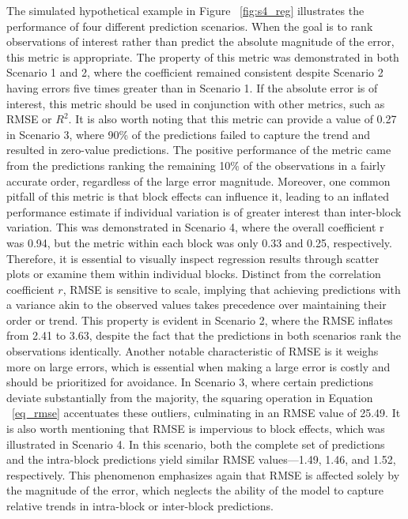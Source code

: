 The simulated hypothetical example in Figure ~\ref{fig:s4_reg} illustrates the performance of four different prediction scenarios. When the goal is to rank observations of interest rather than predict the absolute magnitude of the error, this metric is appropriate. The property of this metric was demonstrated in both Scenario 1 and 2, where the coefficient remained consistent despite Scenario 2 having errors five times greater than in Scenario 1. If the absolute error is of interest, this metric should be used in conjunction with other metrics, such as RMSE or $R^2$. It is also worth noting that this metric can provide a value of 0.27 in Scenario 3, where 90\% of the predictions failed to capture the trend and resulted in zero-value predictions. The positive performance of the metric came from the predictions ranking the remaining 10\% of the observations in a fairly accurate order, regardless of the large error magnitude. Moreover, one common pitfall of this metric is that block effects can influence it, leading to an inflated performance estimate if individual variation is of greater interest than inter-block variation. This was demonstrated in Scenario 4, where the overall coefficient r was 0.94, but the metric within each block was only 0.33 and 0.25, respectively. Therefore, it is essential to visually inspect regression results through scatter plots or examine them within individual blocks.
Distinct from the correlation coefficient $r$, RMSE is sensitive to scale, implying that achieving predictions with a variance akin to the observed values takes precedence over maintaining their order or trend. This property is evident in Scenario 2, where the RMSE inflates from 2.41 to 3.63, despite the fact that the predictions in both scenarios rank the observations identically. Another notable characteristic of RMSE is it weighs more on large errors, which is essential when making a large error is costly and should be prioritized for avoidance. In Scenario 3, where certain predictions deviate substantially from the majority, the squaring operation in Equation ~\ref{eq_rmse} accentuates these outliers, culminating in an RMSE value of 25.49. It is also worth mentioning that RMSE is impervious to block effects, which was illustrated in Scenario 4. In this scenario, both the complete set of predictions and the intra-block predictions yield similar RMSE values—1.49, 1.46, and 1.52, respectively. This phenomenon emphasizes again that RMSE is affected solely by the magnitude of the error, which neglects the ability of the model to capture relative trends in intra-block or inter-block predictions.
